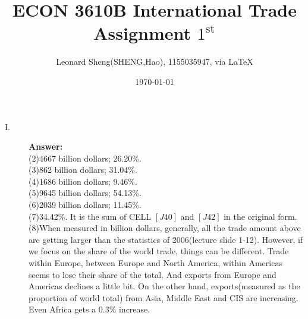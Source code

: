 \documentclass{article}
\begin{document}
\title{ECON 3610B International Trade \\Assignment $1^{\text{st}}$}
\author{{\normalsize Leonard Sheng(SHENG,Hao), 1155035947, via \LaTeX}}
\date{\today}

\maketitle
\baselineskip 0.6cm

\begin{description}
    \item[I.]{\bf Answer:}\\
        (2)4667 billion dollars; 26.20\%.\\
        (3)862 billion dollars; 31.04\%.\\
        (4)1686 billion dollars; 9.46\%.\\
        (5)9645 billion dollars; 54.13\%.\\
        (6)2039 billion dollars; 11.45\%.\\
        (7)34.42\%. It is the sum of CELL $[J40]$ and $[J42]$ in the original form.\\
        (8)When measured in billion dollars, generally, all the trade amount above are getting larger than the statistics of 2006(lecture slide 1-12). However, if we focus on the share of the world trade, things can be different. Trade within Europe, between Europe and North America, within Americas seems to lose their share of the total. And exports from Europe and Americas declines a little bit. On the other hand, exports(measured as the proportion of world total) from Asia, Middle East and CIS are increasing. Even Africa gets a 0.3\% increase.



\end{description}
\end{document}
